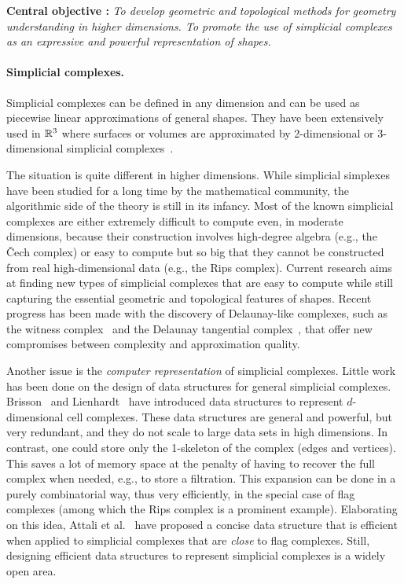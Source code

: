 \vspace{2mm}  

{\bf Central objective :} {\em To develop geometric and topological methods for geometry understanding in higher dimensions.  To promote the use  of simplicial complexes as an expressive and powerful representation of shapes. }

\paragraph{Simplicial complexes.}  Simplicial complexes can be defined in any dimension and can be used as piecewise linear approximations of general shapes.
They have been extensively used in $\mathbb R ^3$ where surfaces or volumes are approximated by 2-dimensional or 3-dimensional simplicial complexes~\cite{geometrica-ecg-book}. 

The situation is quite different in higher dimensions. While simplicial simplexes have been studied for a long time by the mathematical community, the algorithmic side of the theory is still in its infancy. Most of the known simplicial complexes are either extremely difficult to compute even, in moderate dimensions, because their construction involves high-degree algebra (e.g., the  \v{C}ech complex) or easy to compute but so big that they cannot be constructed from real high-dimensional data (e.g., the Rips complex). Current research aims at finding new types of simplicial complexes that are easy to compute while still capturing the essential geometric and topological features of shapes. Recent progress has been made with the discovery of Delaunay-like complexes, such as the witness complex~\cite{cds-tewc-2004} and the Delaunay tangential complex~\cite{geometrica-7142i}, that offer new compromises between complexity and approximation quality.

 
Another issue is the {\em computer representation} of simplicial complexes. 
Little work has been done on the design of data structures for general
simplicial complexes. Brisson~\cite{Brisson:1989:RGS:73833.73858} and
Lienhardt~\cite{DBLP:journals/ijcga/Lienhardt94} have introduced data
structures to represent $d$-dimensional cell complexes. These data
structures are general and powerful, but very redundant, and they do
not scale to large data sets in high dimensions.  In contrast, one
could store only the 1-skeleton of the complex (edges and vertices). This 
saves a lot of memory space at the penalty of having to recover the full complex when needed, e.g., to store a filtration. This expansion can be done in a purely combinatorial way, thus very efficiently, in the special case of flag complexes (among which the Rips complex is a prominent example). Elaborating on this idea, Attali et al.~\cite{Attali2011} have proposed a concise data structure that is efficient when applied to simplicial complexes that are {\em close} to flag complexes. Still, designing efficient data structures to represent simplicial complexes is a widely open area.

